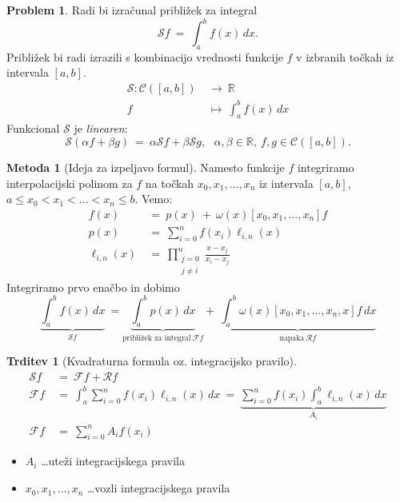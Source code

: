 \documentclass[11pt]{article}
\newcommand{\R}{\mathbb{R}}
\newcommand{\C}{\mathcal{C}}
\newcommand{\s}{\mathcal{S}}
\newcommand{\rr}{\mathcal{R}}
\newcommand{\F}{\mathcal{F}}
\theoremstyle{definition}
\theoremstyle{definition}
\newtheorem{problem}{Problem}[section]
\newtheorem{trditev}{Trditev}[section]
\newtheorem*{metoda}{Metoda}
\begin{document}
\begin{problem}

Radi bi izračunal približek za integral
$$\s f ~=~ \int_a^b f(x)\,dx.$$
Približek bi radi izrazili s kombinacijo vrednosti funkcije $f$ v izbranih točkah iz intervala $[a, b]$.
\begin{align*}
\s: \C([a, b]) ~&\rightarrow~ \R \\
f ~&\mapsto~ \int_a^b f(x)\,dx
\end{align*}
Funkcional $\s$ je \textit{linearen}:
$$\s (\alpha f + \beta g) ~=~ \alpha \s f + \beta \s g, ~~~\alpha, \beta \in \R, ~f, g \in \C([a, b]).$$

\end{problem}
\vspace{0.5cm}

\begin{metoda}[Ideja za izpeljavo formul]

Namesto funkcije $f$ integriramo interpolacijski polinom za $f$ na točkah $x_0, x_1, \ldots, x_n$ iz intervala $[a, b]$, \\$a \leq x_0 < x_1 < \ldots < x_n \leq b$. Vemo:
\begin{align*}
f(x) ~&=~ p(x) ~+~ \omega(x) [x_0, x_1, \ldots, x_n]f \\
p(x) ~&=~ \sum_{i=0}^n f(x_i) \ell_{i, n}(x) \\ 
\ell_{i, n}(x) ~&=~ \prod_{\substack{j=0\\ j \neq i}}^n \frac{x-x_j}{x_i-x_j}
\end{align*}
Integriramo prvo enačbo in dobimo
$$\underbrace{\int_a^b f(x)\,dx}_{\s f} ~= \underbrace{\int_a^b p(x)\,dx}_{\text{približek za integral}~\F f} +~ \underbrace{\int_a^b \omega(x) [x_0, x_1, \ldots, x_n, x]f\,dx}_{\text{napaka}~\rr f}$$

\end{metoda}
\vspace{0.5cm}

\begin{trditev}[Kvadraturna formula oz. integracijsko pravilo]

\begin{align*}
\s f ~&=~ \F f + \rr f \\
\F f ~&=~ \int_a^b \sum_{i=0}^n f(x_i) \ell_{i, n}(x)\,dx ~=~ \underbrace{\sum_{i=0}^n f(x_i) \int_a^b \ell_{i, n}(x)\,dx}_{A_i} \\
\F f ~&=~ \sum_{i=0}^n A_i f(x_i)
\end{align*}

\begin{itemize}
	\item $A_i$ \ldots uteži integracijskega pravila
	\item $x_0, x_1, \ldots, x_n$ \ldots vozli integracijskega pravila
\end{itemize}

\end{trditev}
\vspace{0.5cm}
\end{document}
